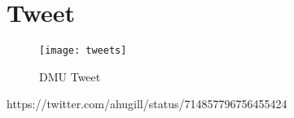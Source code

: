 \section{Tweet}

\begin{figure}[!htbp]
  \centering
  \texttt{[image: tweets]}
\caption[DMU Tweet]{DMU Tweet}
\label{fig:tweet}
\end{figure}

https://twitter.com/ahugill/status/714857796756455424


\stopcontents[chapters]
